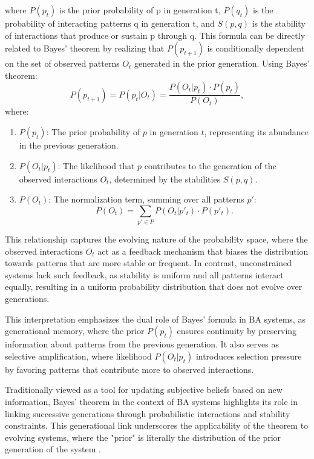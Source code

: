 \documentclass[entropy,article,submit,pdftex,oneauthor]{Definitions/mdpi}
\begin{document}
where \( P(p_t) \) is the prior probability of p in generation t, \( P(q_t) \) is the probability of interacting patterns q in generation t, and \( S(p, q) \) is the stability of interactions that produce or sustain p through q. This formula can be directly related to Bayes' theorem by realizing that \( P(p_{t+1}) \) is conditionally dependent on the set of observed patterns \( O_t \) generated in the prior generation. Using Bayes' theorem:
\begin{equation}
P(p_{t+1}) = P(p_t | O_t) = \frac{P(O_t | p_t) \cdot P(p_t)}{P(O_t)},
\end{equation}
where:
\begin{enumerate}
    \item[] \( P(p_t) \): The prior probability of \( p \) in generation \( t \), representing its abundance in the previous generation.
    \item[] \( P(O_t | p_t) \): The likelihood that \( p \) contributes to the generation of the observed interactions \( O_t \), determined by the stabilities \( S(p, q) \).
    \item[] \( P(O_t) \): The normalization term, summing over all patterns \( p' \):
    \[
    P(O_t) = \sum_{p' \in P} P(O_t | p'_t) \cdot P(p'_t).
    \]
\end{enumerate}

This relationship captures the evolving nature of the probability space, where the observed interactions \( O_t \) act as a feedback mechanism that biases the distribution towards patterns that are more stable or frequent. In contrast, unconstrained systems lack such feedback, as stability is uniform and all patterns interact equally, resulting in a uniform probability distribution that does not evolve over generations. 

This interpretation emphasizes the dual role of Bayes' formula in BA systems, as generational memory, where the prior \( P(p_t) \) ensures continuity by preserving information about patterns from the previous generation.
It also serves as selective amplification, where likelihood \( P(O_t | p_t) \) introduces selection pressure by favoring patterns that contribute more to observed interactions. 

Traditionally viewed as a tool for updating subjective beliefs based on new information, Bayes’ theorem in the context of BA systems highlights its role in linking successive generations through probabilistic interactions and stability constraints. This generational link underscores the applicability of the theorem to evolving systems, where the "prior" is literally the distribution of the prior generation of the system \cite{le2020equation}.
\end{document}
